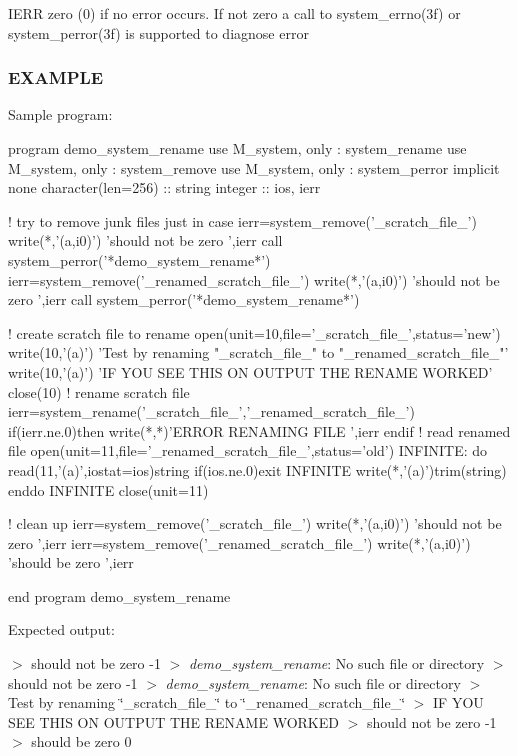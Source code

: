 I\+E\+RR zero (0) if no error occurs. If not zero a call to system\+\_\+errno(3f) or system\+\_\+perror(3f) is supported to diagnose error \subsubsection*{E\+X\+A\+M\+P\+LE}

\begin{DoxyVerb}Sample program:

  program demo_system_rename
  use M_system, only : system_rename
  use M_system, only : system_remove
  use M_system, only : system_perror
  implicit none
  character(len=256) :: string
  integer            :: ios, ierr

  ! try to remove junk files just in case
  ierr=system_remove('_scratch_file_')
  write(*,'(a,i0)') 'should not be zero ',ierr
  call system_perror('*demo_system_rename*')
  ierr=system_remove('_renamed_scratch_file_')
  write(*,'(a,i0)') 'should not be zero ',ierr
  call system_perror('*demo_system_rename*')

  ! create scratch file to rename
  open(unit=10,file='_scratch_file_',status='new')
  write(10,'(a)') 'Test by renaming "_scratch_file_" to "_renamed_scratch_file_"'
  write(10,'(a)') 'IF YOU SEE THIS ON OUTPUT THE RENAME WORKED'
  close(10)
  ! rename scratch file
  ierr=system_rename('_scratch_file_','_renamed_scratch_file_')
  if(ierr.ne.0)then
     write(*,*)'ERROR RENAMING FILE ',ierr
  endif
  ! read renamed file
  open(unit=11,file='_renamed_scratch_file_',status='old')
  INFINITE: do
     read(11,'(a)',iostat=ios)string
     if(ios.ne.0)exit INFINITE
     write(*,'(a)')trim(string)
  enddo INFINITE
  close(unit=11)

  ! clean up
  ierr=system_remove('_scratch_file_')
  write(*,'(a,i0)') 'should not be zero ',ierr
  ierr=system_remove('_renamed_scratch_file_')
  write(*,'(a,i0)') 'should be zero ',ierr

  end program demo_system_rename
\end{DoxyVerb}


Expected output\+:

$>$ should not be zero -\/1 $>$ {\itshape demo\+\_\+system\+\_\+rename}\+: No such file or directory $>$ should not be zero -\/1 $>$ {\itshape demo\+\_\+system\+\_\+rename}\+: No such file or directory $>$ Test by renaming \char`\"{}\+\_\+scratch\+\_\+file\+\_\+\char`\"{} to \char`\"{}\+\_\+renamed\+\_\+scratch\+\_\+file\+\_\+\char`\"{} $>$ IF Y\+OU S\+EE T\+H\+IS ON O\+U\+T\+P\+UT T\+HE R\+E\+N\+A\+ME W\+O\+R\+K\+ED $>$ should not be zero -\/1 $>$ should be zero 0 


